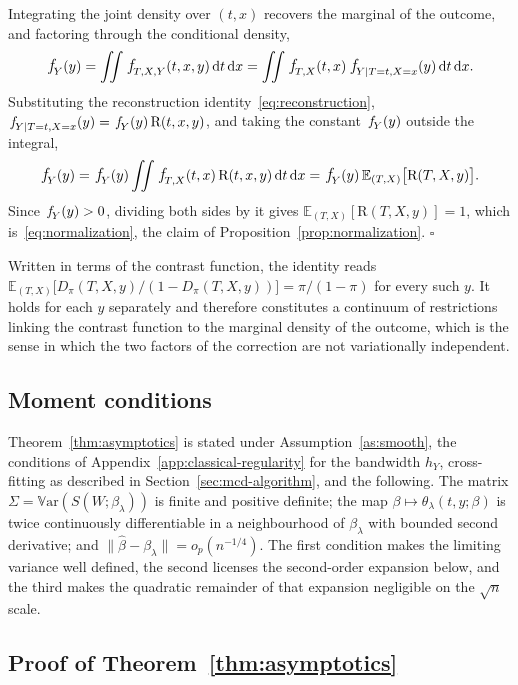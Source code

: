 \documentclass[11pt]{article}
\theoremstyle{plain}
\theoremstyle{definition}
\theoremstyle{remark}
\newcommand{\pE}{\ensuremath{\mathbb{E}}}
\newcommand{\Var}{\mathbb{V}\text{ar}}
\newcommand{\pf}[1]{\ensuremath{\,\mathlarger{\textit{f}}_{#1}}}
\newcommand{\ratio}{\ensuremath{\pi}}
\newcommand{\contrast}{D_{\ratio}}
\newcommand{\DensityRatio}{\text{R}}
\newcommand{\betahat}{\widehat{\beta}}
\newcommand{\dd}{\,\mathrm{d}}
\newcommand{\score}{S}
\begin{document}
Integrating the joint density over $(t,x)$ recovers the marginal of the outcome, and factoring
through the conditional density,
\[
\pf{Y}(y)
= \iint \pf{T,X,Y}(t,x,y) \dd t \dd x
= \iint \pf{T,X}(t,x)\,\pf{Y \mid T=t,X=x}(y) \dd t \dd x .
\]
Substituting the reconstruction identity~\eqref{eq:reconstruction},
$\pf{Y \mid T=t,X=x}(y) = \pf{Y}(y)\,\DensityRatio(t,x,y)$, and taking the constant $\pf{Y}(y)$
outside the integral,
\[
\pf{Y}(y)
= \pf{Y}(y) \iint \pf{T,X}(t,x)\,\DensityRatio(t,x,y) \dd t \dd x
= \pf{Y}(y)\,\pE_{(T,X)}\big[ \DensityRatio(T,X,y) \big].
\]
Since $\pf{Y}(y) > 0$, dividing both sides by it gives
$\pE_{(T,X)}[\DensityRatio(T,X,y)] = 1$, which is~\eqref{eq:normalization}, the claim of
Proposition~\ref{prop:normalization}. \hfill$\square$

Written in terms of the contrast function, the identity reads
$\pE_{(T,X)}\big[\contrast(T,X,y)/(1-\contrast(T,X,y))\big] = \ratio/(1-\ratio)$ for every such
$y$. It holds for each $y$ separately and therefore constitutes a continuum of restrictions
linking the contrast function to the marginal density of the outcome, which is the sense in
which the two factors of the correction are not variationally independent.

\subsection{Moment conditions}
\label{app:asymptotics-conditions}

Theorem~\ref{thm:asymptotics} is stated under Assumption~\ref{as:smooth}, the conditions of
Appendix~\ref{app:classical-regularity} for the bandwidth $h_Y$, cross-fitting as described in
Section~\ref{sec:mcd-algorithm}, and the following. The matrix
$\Sigma = \Var(\score(W;\beta_\lambda))$ is finite and positive definite; the map
$\beta \mapsto \theta_\lambda(t,y;\beta)$ is twice continuously differentiable in a
neighbourhood of $\beta_\lambda$ with bounded second derivative; and
$\|\betahat - \beta_\lambda\| = o_p(n^{-1/4})$. The first condition makes the limiting variance
well defined, the second licenses the second-order expansion below, and the third makes the
quadratic remainder of that expansion negligible on the $\sqrt n$ scale.

\subsection{Proof of Theorem~\ref{thm:asymptotics}}
\label{app:asymptotics-remainder}
\end{document}
